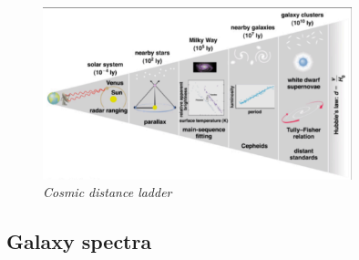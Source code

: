 \documentclass[11pt]{article}
\numberwithin{equation}{section}
\begin{document}
\begin{figure}[H]
\centering
\includegraphics[width=0.8\textwidth]{Graph5.png}
\caption{\label{fig:2}\emph{Cosmic distance ladder}}
\end{figure}

\subsection{Galaxy spectra}
\end{document}
